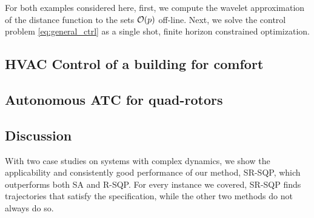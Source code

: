 For both examples considered here, first, we compute the wavelet approximation of the distance function to the sets $\mathcal{O}(p)$ off-line. Next, we solve the control problem \eqref{eq:general_ctrl} as a single shot, finite horizon constrained optimization. 


\subsection{HVAC Control of a building for comfort}


\vspace{-10pt}
\subsection{Autonomous ATC for quad-rotors}
\label{sec:ATCquad}


\subsection{Discussion}
With two case studies on systems with complex dynamics, we show the applicability and consistently good performance of our method, SR-SQP, which outperforms both SA and R-SQP. For every instance we covered, SR-SQP finds trajectories that satisfy the specification, while the other two methods do not always do so.


